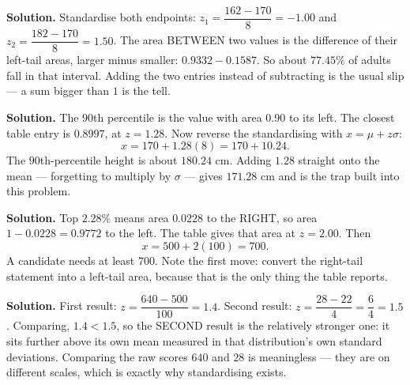 \documentclass[12pt]{article}
\begin{document}


\textbf{Solution.} Standardise both endpoints: $z_{1} = \dfrac{162 - 170}{8} = -1.00$ and $z_{2} = \dfrac{182 - 170}{8} = 1.50$. The area BETWEEN two values is the difference of their left-tail areas, larger minus smaller: $0.9332 - 0.1587$. So about $77.45\%$ of adults fall in that interval. Adding the two entries instead of subtracting is the usual slip --- a sum bigger than $1$ is the tell.



\textbf{Solution.} The $90$th percentile is the value with area $0.90$ to its left. The closest table entry is $0.8997$, at $z = 1.28$. Now reverse the standardising with $x = \mu + z\sigma$:
\[
x = 170 + 1.28(8) = 170 + 10.24 .
\]
The $90$th-percentile height is about $180.24$ cm. Adding $1.28$ straight onto the mean --- forgetting to multiply by $\sigma$ --- gives $171.28$ cm and is the trap built into this problem.



\textbf{Solution.} Top $2.28\%$ means area $0.0228$ to the RIGHT, so area $1 - 0.0228 = 0.9772$ to the left. The table gives that area at $z = 2.00$. Then
\[
x = 500 + 2(100) = 700 .
\]
A candidate needs at least $700$. Note the first move: convert the right-tail statement into a left-tail area, because that is the only thing the table reports.



\textbf{Solution.} First result: $z = \dfrac{640 - 500}{100} = 1.4$. Second result: $z = \dfrac{28 - 22}{4} = \dfrac{6}{4} = 1.5$. Comparing, $1.4 < 1.5$, so the SECOND result is the relatively stronger one: it sits further above its own mean measured in that distribution's own standard deviations. Comparing the raw scores $640$ and $28$ is meaningless --- they are on different scales, which is exactly why standardising exists.

\end{document}

